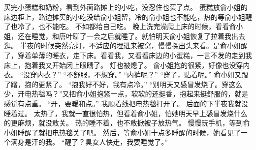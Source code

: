 买完小蛋糕和奶粉，看到外面路摊上的小吃，没忍住也买了点。
蛋糕放俞小姐的床边柜上，路边摊买的小吃没给俞小姐留，冷的俞小姐也不能吃，热的等俞小姐醒了也冷了，也不能吃。
不如都给自己吃。
晚上洗完澡爬上床的时候，看看俞小姐，还在睡觉，和唐叶聊了一会之后就睡了。就怕明天俞小姐恢复了拉着我出去逛。
半夜的时候突然亮灯，不适应的埋进来被窝，慢慢探出头来看。是俞小姐醒了，穿着单薄的睡衣，走下床。看看我，又看看床边的小蛋糕，一言不发的走到我床上，抱着我又开始闭上眼睛了。
灯也被熄了。
俞小姐抱的很紧，好像也没穿内衣。
“没穿内衣？”
“不舒服，不想穿。”
“内裤呢？”
“穿了，贴着呢。”
俞小姐又蹭了蹭，抱的更紧了。
“抱我好不好，我有点冷。”
“别明天又感冒发烧了。穿这么少，开电热毯吗？”又把俞小姐抱紧一点，软软的还挺香，抱起来挺舒服的，就是感觉有点重。
“开，要暖和点。”
我顺着线把电热毯打开了。
后面的下半夜我就没睡着过。
太热了，我就一直很怕热，但看着俞小姐，怕她明天早上感冒发烧什么的更麻烦，就没敢关。
热的睡不着，也不敢掀被子放热气。
慢慢玩手机，等到俞小姐睡醒了就把电热毯关了吧。
然后，等俞小姐十点多睡醒的时候，她看见了一个满身是汗的我。
“醒了？臭女人快走，我要睡觉了。”


